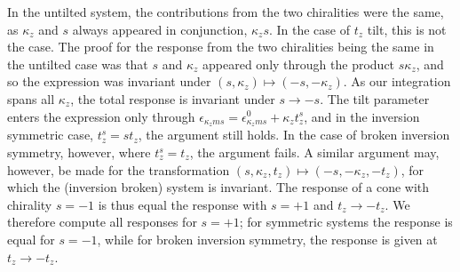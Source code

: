 In the untilted system, the contributions from the two chiralities were the same, as \( \kappa_z \) and \( s \) always appeared in conjunction, \( \kappa_z s \).
In the case of \( t_z \) tilt, this is not the case.
The proof for the response from the two chiralities being the same in the untilted case was that \( s \) and \( \kappa_z \) appeared only through the product \( s \kappa_z \), and so the expression was invariant under \( (s, \kappa_z) \mapsto (-s, -\kappa_z) \).
As our integration spans all \( \kappa_z \), the total response is invariant under \( s \to -s \).
The tilt parameter enters the expression only through \( \epsilon_{\kappa_z m s} = \epsilon_{\kappa_z m s}^0 + \kappa_z t^s_z \), and in the inversion symmetric case, \( t^s_z = s t_z \), the argument still holds.
In the case of broken inversion symmetry, however, where \( t^s_z = t_z \), the argument fails.
A similar argument may, however, be made for the transformation \( (s, \kappa_z, t_z) \mapsto (-s, -\kappa_z, -t_z) \), for which the (inversion broken) system is invariant.
The response of a cone with chirality \( s = -1 \) is thus equal the response with \( s = +1 \) and \( t_z \to -t_z \).
We therefore compute all responses for \( s=+1 \);
for symmetric systems the response is equal for \( s=-1 \), while for broken inversion symmetry, the response is given at \( t_z \to -t_z \).

